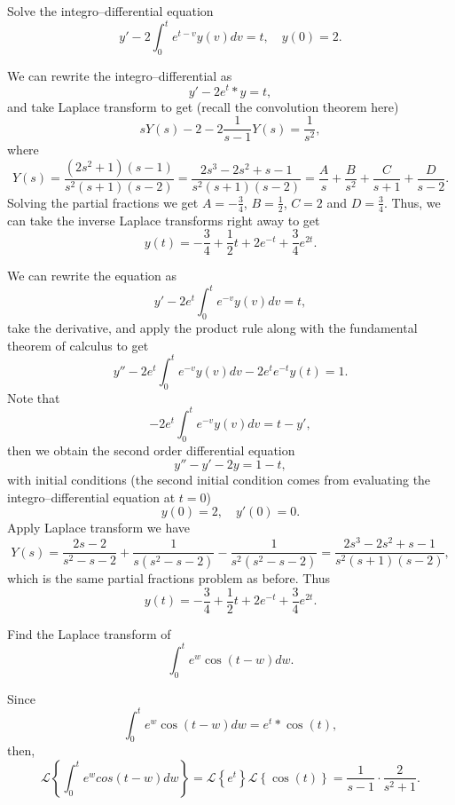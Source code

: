 \documentclass[11pt]{article}
\begin{document}
\begin{problem}
Solve the integro--differential equation
\[y'-2\int_{0}^{t}e^{t-v}y(v)dv=t,\quad y(0)=2.\]
\end{problem}
\begin{solution}
We can rewrite the integro--differential as
\[y'-2e^{t}*y=t,\]
and take Laplace transform to get (recall the convolution theorem here)
\[sY(s)-2-2\frac{1}{s-1}Y(s)=\frac{1}{s^{2}},\]
where
\[Y(s)=\frac{(2s^{2}+1)(s-1)}{s^{2}(s+1)(s-2)}=\frac{2s^{3}-2s^{2}+s-1}{s^{2}(s+1)(s-2)}=\frac{A}{s}+\frac{B}{s^{2}}+\frac{C}{s+1}+\frac{D}{s-2}.\]
Solving the partial fractions we get $A=-\frac{3}{4}$, $B=\frac{1}{2}$, $C=2$ and $D=\frac{3}{4}$.
Thus, we can take the inverse Laplace transforms right away to get
\[\boxed{y(t)=-\frac{3}{4}+\frac{1}{2}t+2e^{-t}+\frac{3}{4}e^{2t}}.\]
\end{solution}
\begin{solution}
We can rewrite the equation as
\[y'-2e^{t}\int_{0}^{t}e^{-v}y(v)dv=t,\]
take the derivative, and apply the product rule along with the fundamental theorem of calculus to get
\[y''-2e^{t}\int_{0}^{t}e^{-v}y(v)dv-2e^{t}e^{-t}y(t)=1.\]
Note that
\[-2e^{t}\int_{0}^{t}e^{-v}y(v)dv=t-y',\]
then we obtain the second order differential equation
\[y''-y'-2y=1-t,\]
with initial conditions (the second initial condition comes from evaluating the integro--differential equation at $t=0$)
\[y(0)=2,\quad y'(0)=0.\]
Apply Laplace transform we have
\[Y(s)=\frac{2s-2}{s^{2}-s-2}+\frac{1}{s(s^{2}-s-2)}-\frac{1}{s^{2}(s^{2}-s-2)}=\frac{2s^{3}-2s^{2}+s-1}{s^{2}(s+1)(s-2)},\]
which is the same partial fractions problem as before. Thus
\[\boxed{y(t)=-\frac{3}{4}+\frac{1}{2}t+2e^{-t}+\frac{3}{4}e^{2t}}.\]
\end{solution}



\begin{problem}
Find the Laplace transform of 
\[\int_{0}^{t}e^{w}\cos(t-w)dw.\]
\end{problem}
\begin{solution}
Since
\[\int_{0}^{t}e^{w}\cos(t-w)dw = e^{t}*\cos(t),\]
then,
\[\mathcal{L}\left\{\int_{0}^{t}e^{w}cos(t-w)dw\right\} = \mathcal{L}\left\{e^{t}\right\} \mathcal{L}\left\{\cos(t)\right\} = \frac{1}{s-1}\cdot\frac{2}{s^{2}+1}.\]
\end{solution}
\end{document}
